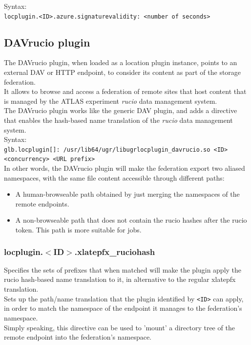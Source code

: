 \documentclass[12pt]{article} %
\begin{document}
Syntax:\\
\lstinline"locplugin.<ID>.azure.signaturevalidity: <number of seconds>"\\





\subsection{DAVrucio plugin}
The DAVrucio plugin, when loaded as a location plugin instance, points to an external DAV or HTTP endpoint, to consider its content as part of the storage federation.\\
It allows to browse and access a federation of remote sites that host content that is managed by the ATLAS experiment \textit{rucio} data management system.\\
The DAVrucio plugin works like the generic DAV plugin, and adds a directive that enables the hash-based name translation of the \textit{rucio} data management system.\\

Syntax:\\
\lstinline"glb.locplugin[]: /usr/lib64/ugr/libugrlocplugin_davrucio.so <ID> <concurrency> <URL prefix>"\\

In other words, the DAVrucio plugin will make the federation export two aliased namespaces, with the same file content accessible through different paths:
\begin{itemize}
 \item A human-browseable path obtained by just merging the namespaces of the remote endpoints.
 \item A non-browseable path that does not contain the rucio hashes after the rucio token. This path is more suitable for jobs.
\end{itemize}


\subsubsection{locplugin.$<$ID$>$.xlatepfx\_ruciohash}

Specifies the sets of prefixes that when matched will make the plugin apply the rucio hash-based name translation to it, in alternative to the regular xlatepfx translation.\\
Sets up the path/name translation that the plugin identified by \lstinline"<ID>" can apply, in order to match the namespace of the endpoint it manages to the federation's namespace.\\
Simply speaking, this directive can be used to 'mount' a directory tree of the remote endpoint into the federation's namespace.\\
\end{document}
